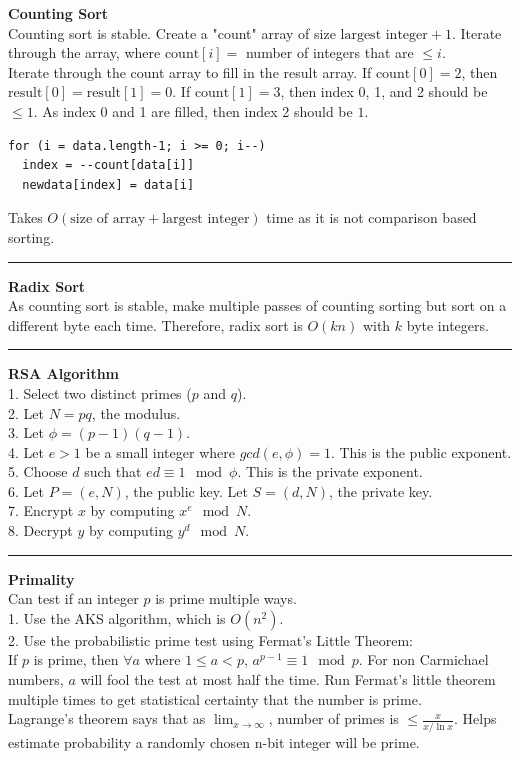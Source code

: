\documentclass[9pt]{amsart}
\begin{document}
\begin{multicols*}{3}
  \vskip 15pt
  \textbf{Counting Sort} \\
  Counting sort is stable. Create a "count" array of size $\text{largest integer} + 1$. Iterate through the array, where $\text{count}[i] = $ number of integers that are $\leq i$. \\
  Iterate through the count array to fill in the result array. If $\text{count}[0] = 2$, then $\text{result}[0] = \text{result}[1] = 0$. If $\text{count}[1] = 3$, then index 0, 1, and 2 should be $\leq 1$. As index 0 and 1 are filled, then index 2 should be $1$.
  \begin{lstlisting}
for (i = data.length-1; i >= 0; i--) 
  index = --count[data[i]]
  newdata[index] = data[i]
  \end{lstlisting}
  Takes $O(\text{size of array} + \text{largest integer})$ time as it is not comparison based sorting.

  \vskip 7pt
  \hrule
  \vskip 7pt

  \textbf{Radix Sort} \\
  As counting sort is stable, make multiple passes of counting sorting but sort on a different byte each time. Therefore, radix sort is $O(kn)$ with $k$ byte integers.

  \vskip 7pt
  \hrule
  \vskip 7pt

  \textbf{RSA Algorithm} \\
  1. Select two distinct primes ($p$ and $q$). \\
  2. Let $N = pq$, the modulus. \\
  3. Let $\phi = (p - 1)(q - 1)$. \\
  4. Let $e > 1$ be a small integer where $gcd(e, \phi) = 1$. This is the public exponent. \\
  5. Choose $d$ such that $ed \equiv 1\mod\phi$. This is the private exponent. \\
  6. Let $P = (e, N)$, the public key. Let $S = (d, N)$, the private key. \\
  7. Encrypt $x$ by computing $x^e \mod N$. \\
  8. Decrypt $y$ by computing $y^d \mod N$.

  \vskip 7pt
  \hrule
  \vskip 7pt

  \textbf{Primality} \\
  Can test if an integer $p$ is prime multiple ways. \\
  1. Use the AKS algorithm, which is $O(n^2)$. \\
  2. Use the probabilistic prime test using Fermat's Little Theorem: \\
  If $p$ is prime, then $\forall a$ where $1 \leq a < p$, $a^{p-1} \equiv 1 \mod p$. For non Carmichael numbers, $a$ will fool the test at most half the time. Run Fermat's little theorem multiple times to get statistical certainty that the number is prime. \\
  Lagrange's theorem says that as $\lim_{x \rightarrow \infty}$, number of primes is $\leq \frac{x}{x / \ln x}$. Helps estimate probability a randomly chosen n-bit integer will be prime.


\end{multicols*}
\end{document}

